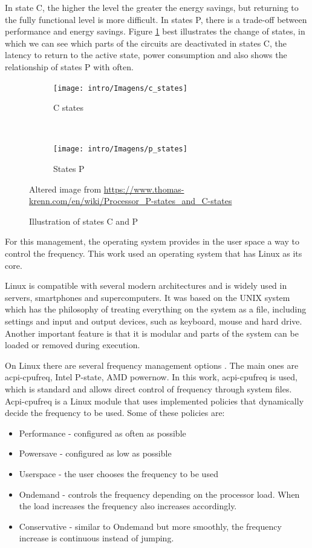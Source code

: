 In state C, the higher the level the greater the energy savings, but returning to the fully functional level is more difficult. In states P, there is a trade-off between performance and energy savings. Figure \ref {fig: p_state} best illustrates the change of states, in which we can see which parts of the circuits are deactivated in states C, the latency to return to the active state, power consumption and also shows the relationship of states P with often.

\begin {figure} [H]
\centering
\begin{subfigure}[t]{0.5\textwidth}
\centering
\texttt{[image: intro/Imagens/c\_states]}
\caption {C states}
\end {subfigure}%
~
\begin{subfigure}[t]{0.5\textwidth}
\centering
\texttt{[image: intro/Imagens/p\_states]}
\caption {States P}
\end {subfigure}
\caption {Illustration of states C and P} {Altered image from \protect \url {https://www.thomas-krenn.com/en/wiki/Processor_P-states_and_C-states}}
\label {fig: p_state}
\end {figure}



For this management, the operating system provides in the user space a way to control the frequency. This work used an operating system that has Linux as its core.

Linux is compatible with several modern architectures and is widely used in servers, smartphones and supercomputers. It was based on the UNIX system which has the philosophy of treating everything on the system as a file, including settings and input and output devices, such as keyboard, mouse and hard drive. Another important feature is that it is modular and parts of the system can be loaded or removed during execution.

On Linux there are several frequency management options \cite {Brown2005}. The main ones are acpi-cpufreq, Intel P-state, AMD powernow. In this work, acpi-cpufreq is used, which is standard and allows direct control of frequency through system files. Acpi-cpufreq is a Linux module that uses implemented policies that dynamically decide the frequency to be used. Some of these policies are:

\begin {itemize}
\item Performance - configured as often as possible
\item Powersave - configured as low as possible
\item Userspace - the user chooses the frequency to be used
\item Ondemand - controls the frequency depending on the processor load. When the load increases the frequency also increases accordingly.
\item Conservative - similar to Ondemand but more smoothly, the frequency increase is continuous instead of jumping.
\end {itemize}

